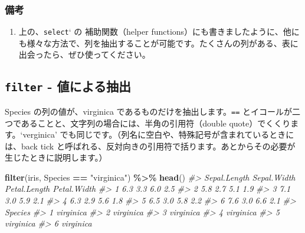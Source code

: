 \documentclass[
  xelatex, ja=standard]{bxjsbook}
\newenvironment{Shaded}{\begin{snugshade}}{\end{snugshade}}
\newcommand{\CommentTok}[1]{\textcolor[rgb]{0.56,0.35,0.01}{\textit{#1}}}
\newcommand{\FunctionTok}[1]{\textcolor[rgb]{0.13,0.29,0.53}{\textbf{#1}}}
\newcommand{\NormalTok}[1]{#1}
\newcommand{\SpecialCharTok}[1]{\textcolor[rgb]{0.81,0.36,0.00}{\textbf{#1}}}
\newcommand{\StringTok}[1]{\textcolor[rgb]{0.31,0.60,0.02}{#1}}
\providecommand{\tightlist}{%
  \setlength{\itemsep}{0pt}\setlength{\parskip}{0pt}}
\theoremstyle{definition}
\theoremstyle{definition}
\theoremstyle{definition}
\theoremstyle{definition}
\theoremstyle{remark}
\begin{document}
\hypertarget{ux5099ux8003-3}{%
\subsubsection{備考}\label{ux5099ux8003-3}}

\begin{enumerate}
\def\labelenumi{\arabic{enumi}.}
\tightlist
\item
  上の、\texttt{select}` の 補助関数（helper functions）にも書きましたように、他にも様々な方法で、列を抽出することが可能です。たくさんの列がある、表に出会ったら、ぜひ使ってください。
\end{enumerate}

\hypertarget{filter---ux5024ux306bux3088ux308bux62bdux51fa}{%
\subsection{\texorpdfstring{\texttt{filter} - 値による抽出}{filter - 値による抽出}}\label{filter---ux5024ux306bux3088ux308bux62bdux51fa}}

Species の列の値が、virginica であるものだけを抽出します。\texttt{==} とイコールが二つであることと、文字列の場合には、半角の引用符（double quote）でくくります。`verginica' でも同じです。（列名に空白や、特殊記号が含まれているときには、back tick と呼ばれる、反対向きの引用符で括ります。あとからその必要が生じたときに説明します。）

\begin{Shaded}
\begin{Highlighting}[]
\FunctionTok{filter}\NormalTok{(iris, Species }\SpecialCharTok{==} \StringTok{"virginica"}\NormalTok{) }\SpecialCharTok{\%\textgreater{}\%} \FunctionTok{head}\NormalTok{()}
\CommentTok{\#\textgreater{}   Sepal.Length Sepal.Width Petal.Length Petal.Width}
\CommentTok{\#\textgreater{} 1          6.3         3.3          6.0         2.5}
\CommentTok{\#\textgreater{} 2          5.8         2.7          5.1         1.9}
\CommentTok{\#\textgreater{} 3          7.1         3.0          5.9         2.1}
\CommentTok{\#\textgreater{} 4          6.3         2.9          5.6         1.8}
\CommentTok{\#\textgreater{} 5          6.5         3.0          5.8         2.2}
\CommentTok{\#\textgreater{} 6          7.6         3.0          6.6         2.1}
\CommentTok{\#\textgreater{}     Species}
\CommentTok{\#\textgreater{} 1 virginica}
\CommentTok{\#\textgreater{} 2 virginica}
\CommentTok{\#\textgreater{} 3 virginica}
\CommentTok{\#\textgreater{} 4 virginica}
\CommentTok{\#\textgreater{} 5 virginica}
\CommentTok{\#\textgreater{} 6 virginica}
\end{Highlighting}
\end{Shaded}
\end{document}
